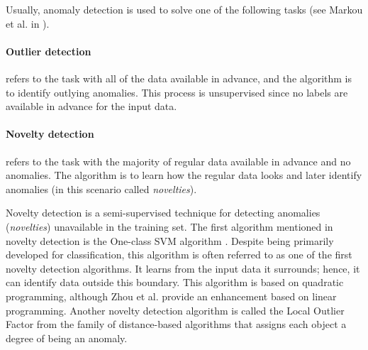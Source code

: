 
Usually, anomaly detection is used to solve one of the following tasks (see Markou et al. in \cite{MARKOU20032481}).

    \paragraph{Outlier detection} refers to the task with all of the data available in advance, and the algorithm is to identify outlying anomalies. This process is unsupervised since no labels are available in advance for the input data.
    \paragraph{Novelty detection} refers to the task with the majority of regular data available in advance and no anomalies. The algorithm is to learn how the regular data looks and later identify anomalies (in this scenario called \emph{novelties}).


Novelty detection is a semi-supervised technique for detecting anomalies (\emph{novelties}) unavailable in the training set.
The first algorithm mentioned in novelty detection is the One-class SVM algorithm \cite{tax2004support}. Despite being primarily developed for classification, this algorithm is often referred to as one of the first novelty detection algorithms. It learns from the input data it surrounds; hence, it can identify data outside this boundary.
This algorithm is based on quadratic programming, although Zhou et al. \cite{ZHOU20022927} provide an enhancement based on linear programming.
Another novelty detection algorithm is called the Local Outlier Factor from the family of distance-based algorithms \cite{breunig2000lof} that assigns each object a degree of being an anomaly.

